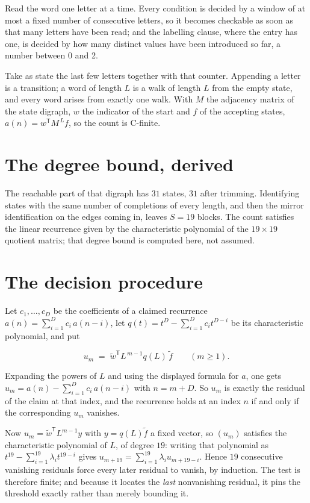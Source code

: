 \documentclass[11pt]{article}
\theoremstyle{definition}
\begin{document}
Read the word one letter at a time. Every condition is decided by a window of at most a fixed number of consecutive letters, so it becomes checkable as soon as that many letters have been read; and the labelling clause, where the entry has one, is decided by how many distinct values have been introduced so far, a number between $0$ and 2.

Take as state the last few letters together with that counter. Appending a letter is a transition; a word of length $L$ is a walk of length $L$ from the empty state, and every word arises from exactly one walk. With $M$ the adjacency matrix of the state digraph, $w$ the indicator of the start and $f$ of the accepting states, $a(n) = w^{\mathsf T}M^{\,L}f$, so the count is C-finite.

\section{The degree bound, derived}

The reachable part of that digraph has $31$ states, $31$ after trimming. Identifying states with the same number of completions of every length, and then the mirror identification on the edges coming in, leaves $S = 19$ blocks. The count satisfies the linear recurrence given by the characteristic polynomial of the $19\times19$ quotient matrix; that degree bound is computed here, not assumed.

\section{The decision procedure}

Let $c_1,\dots,c_D$ be the coefficients of a claimed recurrence $a(n) = \sum_{i=1}^{D} c_i\,a(n-i)$, let $q(t) = t^{D} - \sum_{i=1}^{D} c_i t^{D-i}$ be its characteristic polynomial, and put

\[u_m \;=\; \tilde w^{\mathsf T} L^{\,m-1} q(L)\,\tilde f \qquad (m \ge 1).\]

Expanding the powers of $L$ and using the displayed formula for $a$, one gets $u_m = a(n) - \sum_{i=1}^{D} c_i\,a(n-i)$ with $n = m + D$. So $u_m$ is exactly the residual of the claim at that index, and the recurrence holds at an index $n$ if and only if the corresponding $u_m$ vanishes.

Now $u_m = \tilde w^{\mathsf T} L^{m-1} y$ with $y = q(L)\tilde f$ a fixed vector, so $(u_m)$ satisfies the characteristic polynomial of $L$, of degree $19$: writing that polynomial as $t^{19} - \sum_{i=1}^{19} \lambda_i t^{19-i}$ gives $u_{m+19} = \sum_{i=1}^{19} \lambda_i u_{m+19-i}$. Hence $19$ consecutive vanishing residuals force every later residual to vanish, by induction. The test is therefore finite; and because it locates the {\itshape last} nonvanishing residual, it pins the threshold exactly rather than merely bounding it.
\end{document}
